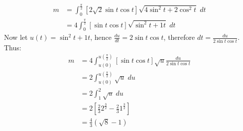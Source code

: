 \documentclass[a4paper, 11pt]{article}
\begin{document}
\begin{enumerate}[label=(\alph*)]
        \begin{align*}
          m & = \int_0^{\frac{\pi}2} \left[ 2\sqrt 2\sin t \cos t  \right]\sqrt{4\sin^2t + 2\cos^2 t}\;dt \\
            & =4 \int_0^{\frac{\pi}2} \left[ \sin t \cos t  \right]\sqrt{\sin^2t + 1 t}\;dt
        \end{align*}
        Now let $u(t)=\sin^2t + 1 t$, hence $\frac{du}{dt} = 2\sin t \cos t$, therefore $dt= \frac{du}{2\sin t \cos t}$. Thus:
        \begin{align*}
          m & = 4 \int_{u(0)}^{u(\frac{\pi}2)} \left[ \sin t \cos t  \right]\sqrt{u}\frac{du}{2\sin t\cos t } \\
            & = 2\int_{u(0)}^{u(\frac{\pi}2)}\sqrt{u}\;du                                                     \\
            & = 2\int_1^2 \sqrt u \; du                                                                       \\
            & = 2\left[  \frac 23 2^{\frac 32} - \frac 23 1^{\frac 32}             \right]                    \\
            & = \frac 43 \left( \sqrt{8} - 1 \right)                                                          \\
        \end{align*}

\end{enumerate}

\end{document}
